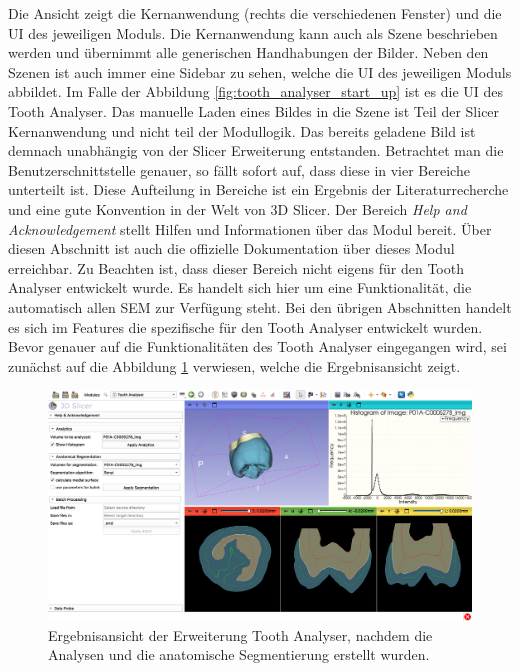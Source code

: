Die Ansicht zeigt die Kernanwendung (rechts die verschiedenen Fenster) und die
\ac{UI} des jeweiligen Moduls. Die Kernanwendung kann auch als Szene beschrieben
werden und übernimmt alle generischen Handhabungen der Bilder. Neben den Szenen ist
auch immer eine Sidebar zu sehen, welche die \ac{UI} des jeweiligen Moduls abbildet.
Im Falle der Abbildung \ref{fig:tooth_analyser_start_up} ist es die \ac{UI} des Tooth
Analyser. Das manuelle Laden eines Bildes in die Szene ist Teil der Slicer
Kernanwendung und nicht teil der Modullogik. Das bereits geladene Bild ist demnach
unabhängig von der Slicer Erweiterung entstanden. Betrachtet man die
Benutzerschnittstelle genauer, so fällt sofort auf, dass diese in vier Bereiche
unterteilt ist. Diese Aufteilung in Bereiche ist ein Ergebnis der Literaturrecherche
und eine gute Konvention in der Welt von 3D Slicer. Der Bereich \textit{Help and
Acknowledgement} stellt Hilfen und Informationen über das Modul bereit. Über
diesen Abschnitt ist auch die offizielle Dokumentation über dieses Modul
erreichbar. Zu Beachten ist, dass dieser Bereich nicht eigens für den Tooth
Analyser entwickelt wurde. Es handelt sich hier um eine Funktionalität, die
automatisch allen \ac{SEM} zur Verfügung steht. Bei den übrigen Abschnitten
handelt es sich im Features die spezifische für den Tooth Analyser entwickelt
wurden. Bevor genauer auf die Funktionalitäten des Tooth Analyser eingegangen wird,
sei zunächst auf die Abbildung \ref{fig:tooth_analyser_full_view} verwiesen, welche
die Ergebnisansicht zeigt.

\begin{figure}[h]
	\centering
	\includegraphics[scale=0.2, width=\textwidth]{img/toothAnalyserFullView.png}
	\caption{Ergebnisansicht der Erweiterung Tooth Analyser, nachdem die Analysen und
	die anatomische Segmentierung erstellt wurden.}
	\label{fig:tooth_analyser_full_view}
\end{figure}

